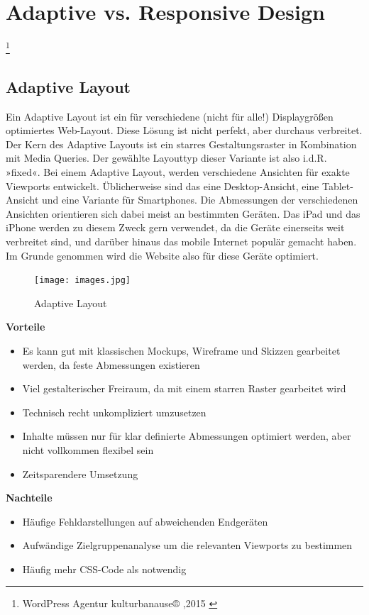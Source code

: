 \chapter{Adaptive vs. Responsive Design}


\footnote{WordPress Agentur kulturbanause® ,2015 \cite{Hellwig2015}}
\section{Adaptive Layout}
Ein Adaptive Layout ist ein für verschiedene (nicht für alle!) Displaygrößen optimiertes Web-Layout. Diese Lösung ist nicht perfekt, aber durchaus verbreitet. Der Kern des Adaptive Layouts ist ein starres Gestaltungsraster in Kombination mit Media Queries. Der gewählte Layouttyp dieser Variante ist also i.d.R. »fixed«.
Bei einem Adaptive Layout, werden verschiedene Ansichten für exakte Viewports entwickelt. Üblicherweise sind das eine Desktop-Ansicht, eine Tablet-Ansicht und eine Variante für Smartphones. Die Abmessungen der verschiedenen Ansichten orientieren sich dabei meist an bestimmten Geräten. Das iPad und das iPhone werden zu diesem Zweck gern verwendet, da die Geräte einerseits weit verbreitet sind, und darüber hinaus das mobile Internet populär gemacht haben. Im Grunde genommen wird die Website also für diese Geräte optimiert.
\begin{figure}[!h]
  \texttt{[image: images.jpg]}
  \caption{Adaptive Layout}
  \label{fig:adaptive layout}
\end{figure}
\newpage \textbf{Vorteile}
\begin{itemize}
\item Es kann gut mit klassischen Mockups, Wireframe und Skizzen gearbeitet werden, da feste Abmessungen existieren
\item Viel gestalterischer Freiraum, da mit einem starren Raster gearbeitet wird
\item Technisch recht unkompliziert umzusetzen
\item Inhalte müssen nur für klar definierte Abmessungen optimiert werden, aber nicht vollkommen flexibel sein
\item Zeitsparendere Umsetzung
\newline
\end{itemize}
\textbf{Nachteile}
\begin{itemize}
\item Häufige Fehldarstellungen auf abweichenden Endgeräten
\item Aufwändige Zielgruppenanalyse um die relevanten Viewports zu bestimmen
\item Häufig mehr CSS-Code als notwendig
\newline
\end{itemize}


